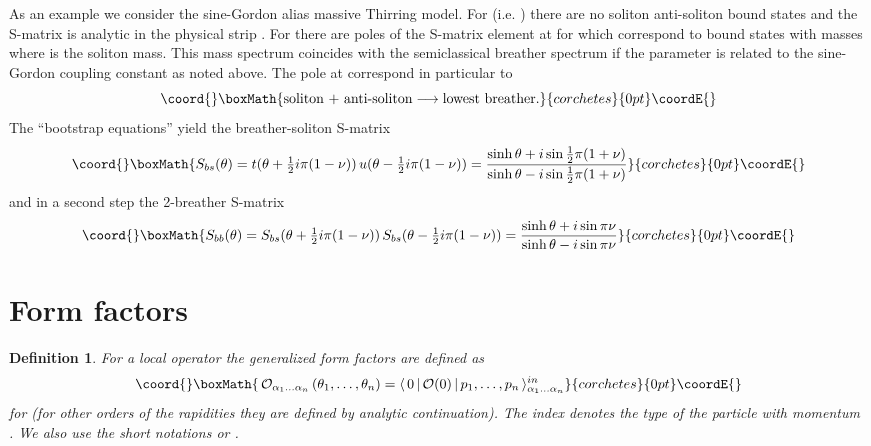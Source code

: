 \documentclass[a4paper,12pt]{article}
\newtheorem{definition}{Definition}{}
\def\func#1{\mathop{\rm #1}}%
\begin{document}
As an example we consider the sine-Gordon alias massive Thirring model. For \coordHE{} (i.e. \coordHE{}) there are no soliton anti-soliton bound states and the
S-matrix \coordHE{} is analytic in the physical strip \myHighlight{$0\leq \func{Im}%
\theta \leq \pi $}\coordHE{}. For \coordHE{} there are poles of the S-matrix element \coordHE{} at \coordHE{} for \coordHE{} which
correspond to bound states with masses \coordHE{}
where \coordHE{} is the soliton mass. This mass spectrum coincides with the
semiclassical \cite{DHNKF} breather spectrum if the parameter \myHighlight{$\nu $}\coordHE{} is
related to the sine-Gordon coupling constant \myHighlight{$\beta $}\coordHE{} as noted above. The
pole at \coordHE{} correspond in particular to 
\[\coord{}\boxMath{
\text{soliton + anti-soliton}\longrightarrow \text{lowest breather.} 
}{corchetes}{0pt}\coordE{}\]
The ``bootstrap equations'' yield the breather-soliton S-matrix \cite{KT} 
\[\coord{}\boxMath{
S_{bs}(\theta )=t(\theta +\tfrac{1}{2}i\pi (1-\nu ))\,u(\theta -\tfrac{1}{2}%
i\pi (1-\nu ))=\frac{\sinh \theta +i\sin \tfrac{1}{2}\pi (1+\nu )}{\sinh
\theta -i\sin \tfrac{1}{2}\pi (1+\nu )} 
}{corchetes}{0pt}\coordE{}\]
and in a second step the 2-breather S-matrix \cite{KT} 
\[\coord{}\boxMath{
S_{bb}(\theta )=S_{bs}(\theta +\tfrac{1}{2}i\pi (1-\nu ))\,S_{bs}(\theta -%
\tfrac{1}{2}i\pi (1-\nu ))=\frac{\sinh \theta +i\sin \pi \nu }{\sinh \theta
-i\sin \pi \nu } 
}{corchetes}{0pt}\coordE{}\]

\section{Form factors}

\begin{definition}
For a local operator \coordHE{} the generalized form factors \cite{KW}
are defined as 
\[\coord{}\boxMath{
\,\mathcal{O}_{\alpha _{1}\dots \alpha _{n}}\left( \theta _{1},\dots ,\theta
_{n}\right) =\langle \,0\,|\,\mathcal{O}(0)\,|\,p_{1},\dots ,p_{n}\,\rangle
_{\alpha _{1}\dots \alpha _{n}}^{in} 
}{corchetes}{0pt}\coordE{}\]
for \coordHE{} (for other orders of the rapidities
they are defined by analytic continuation). The index \coordHE{}%
\thinspace denotes the type of the particle with momentum \coordHE{}. We also
use the short notations \coordHE{} or \coordHE{}.
\end{definition}
\end{document}
